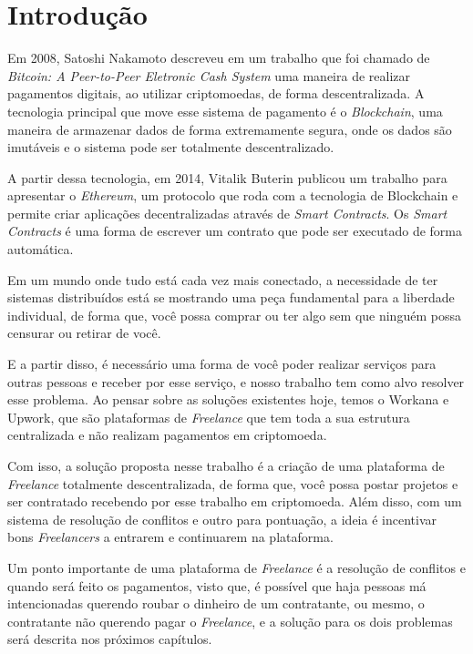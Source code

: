 \chapter{Introdução}

Em 2008, Satoshi Nakamoto descreveu em um trabalho que foi chamado de \textit{Bitcoin: A Peer-to-Peer Eletronic Cash System} uma maneira de realizar pagamentos digitais, ao utilizar criptomoedas, de forma descentralizada. \cite{bitcoin} A tecnologia principal que move esse sistema de pagamento é o \textit{Blockchain}, uma maneira de armazenar dados de forma extremamente segura, onde os dados são imutáveis e o sistema pode ser totalmente descentralizado.\cite{blockchain}

A partir dessa tecnologia, em 2014, Vitalik Buterin publicou um trabalho para apresentar o \textit{Ethereum}, um protocolo que roda com a tecnologia de Blockchain e permite criar aplicações decentralizadas através de \textit{Smart Contracts}.\cite{ethereum} \cite{ethereum_yellow} Os \textit{Smart Contracts} é uma forma de escrever um contrato que pode ser executado de forma automática.\cite{smart_contract} \cite{smart_contract_blockchain}

Em um mundo onde tudo está cada vez mais conectado, a necessidade de ter sistemas distribuídos está se mostrando uma peça fundamental para a liberdade individual, de forma que, você possa comprar ou ter algo sem que ninguém possa censurar ou retirar de você.\cite{decentralization}

E a partir disso, é necessário uma forma de você poder realizar serviços para outras pessoas e receber por esse serviço, e nosso trabalho tem como alvo resolver esse problema. Ao pensar sobre as soluções existentes hoje, temos o Workana e Upwork, que são plataformas de \textit{Freelance} que tem toda a sua estrutura centralizada e não realizam pagamentos em criptomoeda.

Com isso, a solução proposta nesse trabalho é a criação de uma plataforma de \textit{Freelance} totalmente descentralizada, de forma que, você possa postar projetos e ser contratado recebendo por esse trabalho em criptomoeda. Além disso, com um sistema de resolução de conflitos e outro para pontuação, a ideia é incentivar bons \textit{Freelancers} a entrarem e continuarem na plataforma.

Um ponto importante de uma plataforma de \textit{Freelance} é a resolução de conflitos e quando será feito os pagamentos, visto que, é possível que haja pessoas má intencionadas querendo roubar o dinheiro de um contratante, ou mesmo, o contratante não querendo pagar o \textit{Freelance}, e a solução para os dois problemas será descrita nos próximos capítulos.

